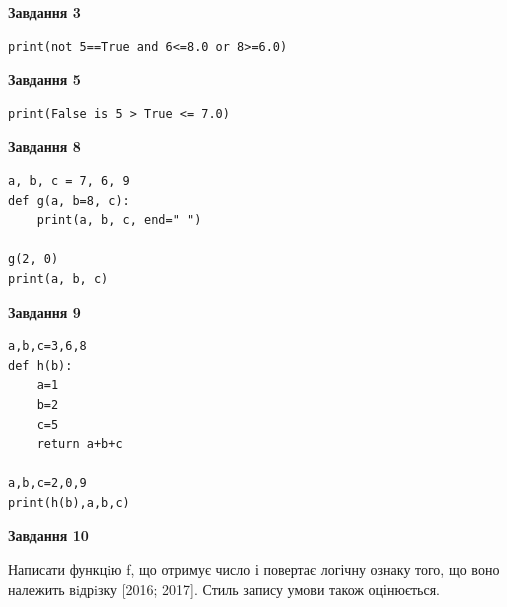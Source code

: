 \documentclass[12pt, ukrainian]{article}
\begin{document}
{\begin {large}
\begin{minipage}[t]{7.5cm}
\end{minipage}
\vline \hspace{6mm}
\begin{minipage}[t]{10.5cm}

\begin{center}
\textbf{Завдання 3}
\end{center}

\begin{verbatim}
print(not 5==True and 6<=8.0 or 8>=6.0)
\end{verbatim}



\begin{center}
\textbf{Завдання 5}
\end{center}

\begin{verbatim}
print(False is 5 > True <= 7.0)
\end{verbatim}



\begin{center}
\textbf{Завдання 8}
\end{center}

\begin{verbatim}
a, b, c = 7, 6, 9
def g(a, b=8, c):
    print(a, b, c, end=" ")

g(2, 0)
print(a, b, c)
\end{verbatim}



\begin{center}
\textbf{Завдання 9}
\end{center}

\begin{verbatim}
a,b,c=3,6,8
def h(b):
    a=1
    b=2
    c=5
    return a+b+c

a,b,c=2,0,9
print(h(b),a,b,c)
\end{verbatim}



\begin{center}
\textbf{Завдання 10}
\end{center}

Написати функцiю f, що отримує число і повертає логічну ознаку того, що воно належить вiдрiзку [2016; 2017]. Стиль запису умови також оцінюється.\par

\end{minipage}

\end {large}}
\newpage
\end{document}
